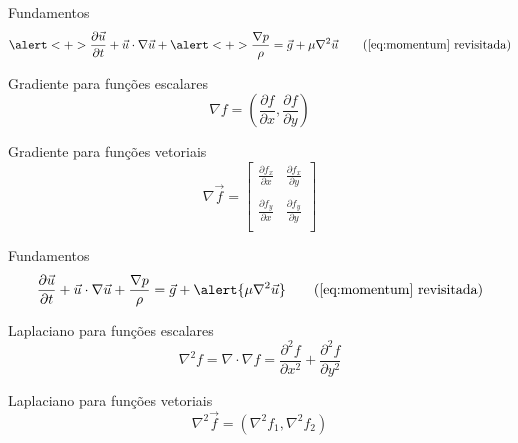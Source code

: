 \documentclass[aspectratio=169,xcolor=dvipsnames]{beamer}
\begin{document}
\begin{frame}{Fundamentos}
    \begin{equation}
        \alert<+>{\frac{\partial \Vec{u}}{\partial t} + \Vec{u} \cdot \nabla \Vec{u}} + \alert<+>{\frac{\nabla p}{\rho}} = \Vec{g} + \mu \nabla^2 \Vec{u}
        \tag{\ref{eq:momentum} revisitada}
    \end{equation}
    
    \begin{block}{Gradiente para funções escalares}
        \begin{equation}
            \nabla f = \left(\frac{\partial f}{\partial x}, \frac{\partial f}{\partial y}\right) \label{eq:gradient}
        \end{equation}
    \end{block}
    
    \begin{block}{Gradiente para funções vetoriais}
        \begin{equation}
            \nabla \Vec{f} =
        \begin{bmatrix}
            \frac{\partial f_x}{\partial x}  & \frac{\partial f_x}{\partial y} \\
            \\
            \frac{\partial f_y}{\partial x} & \frac{\partial f_y}{\partial y} \\
        \end{bmatrix}
        \end{equation}
    \end{block}

\end{frame}

\begin{frame}{Fundamentos}
    \begin{equation}
        \frac{\partial \Vec{u}}{\partial t} + \Vec{u} \cdot \nabla \Vec{u} + \frac{\nabla p}{\rho} = \Vec{g} + \alert{\mu \nabla^2 \Vec{u}}
        \tag{\ref{eq:momentum} revisitada}
    \end{equation}
    \begin{block}{Laplaciano para funções escalares}
        \begin{equation}
        \nabla^2 f = \nabla \cdot \nabla f = \frac{\partial^2 f}{\partial x^2} + \frac{\partial^2 f}{\partial y^2}
    \end{equation}
    \end{block}
    
    \begin{block}{Laplaciano para funções vetoriais}
        \begin{equation}
        \nabla^2 \Vec{f} = (\nabla^2 f_1, \nabla^2 f_2)
        \end{equation}
    \end{block}
\end{frame}
\end{document}
